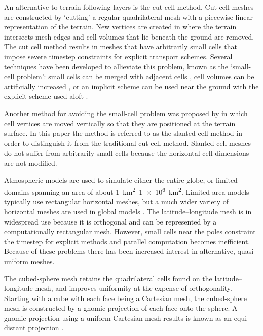 An alternative to terrain-following layers is the cut cell method.  Cut cell meshes are constructed by `cutting' a regular quadrilateral mesh with a piecewise-linear representation of the terrain.  New vertices are created in where the terrain intersects mesh edges and cell volumes that lie beneath the ground are removed.  The cut cell method results in meshes that have arbitrarily small cells that impose severe timestep constraints for explicit transport schemes.  Several techniques have been developed to allieviate this problem, known as the `small-cell problem': small cells can be merged with adjacent cells \citep{yamazaki2016}, cell volumes can be artificially increased \citep{steppeler2002}, or an implicit scheme can be used near the ground with the explicit scheme used aloft \citep{jebens2011}.

Another method for avoiding the small-cell problem was proposed by \citep{shaw-weller2016} in which cell vertices are moved vertically so that they are positioned at the terrain surface.  In this paper the method is referred to as the slanted cell method in order to distinguish it from the traditional cut cell method.  Slanted cell meshes do not suffer from arbitrarily small cells because the horizontal cell dimensions are not modified.

Atmospheric models are used to simulate either the entire globe, or limited domains spanning an area of about \SIrange{1}{1e6}{\kilo\meter\squared}.  Limited-area models typically use rectangular horizontal meshes, but a much wider variety of horizontal meshes are used in global models \citep{staniforth-thuburn2012}.  The latitude--longitude mesh is in widespread use because it is orthogonal and can be represented by a computationally rectangular mesh.  However, small cells near the poles constraint the timestep for explicit methods and parallel computation becomes inefficient.  Because of these problems there has been increased interest in alternative, quasi-uniform meshes.

The cubed-sphere mesh retains the quadrilateral cells found on the latitude--longitude mesh, and improves uniformity at the expense of orthogonality.  Starting with a cube with each face being a Cartesian mesh, the cubed-sphere mesh is constructed by a gnomic projection of each face onto the sphere.  A gnomic projection using a uniform Cartesian mesh results is known as an equi-distant projection \citep{staniforth-thuburn2012}.



